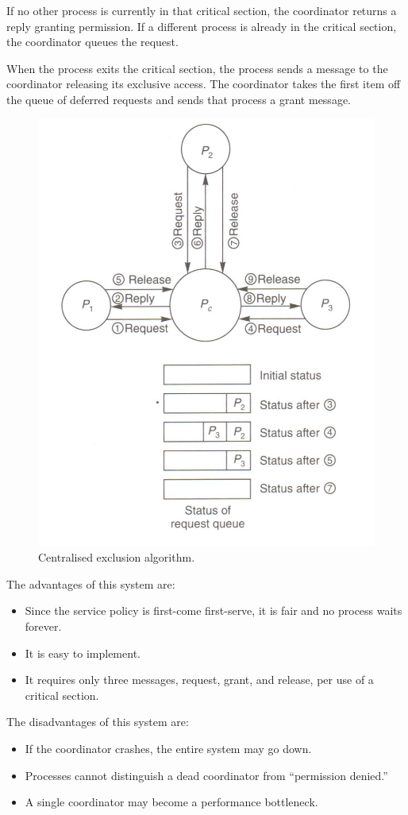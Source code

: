 If no other process is currently in that critical section, the coordinator returns a reply granting permission. If a different process is already in the critical section, the coordinator 
queues the request. 

When the process exits the critical section, the process sends a message to the coordinator releasing its exclusive access. The coordinator takes the first item off the queue of deferred requests and sends that process a grant message.

\begin{figure}
\centering
\includegraphics[width=0.7\linewidth]{figures/screenshot033}
\caption{Centralised exclusion algorithm.}
\label{fig:screenshot033}
\end{figure}

The advantages of this system are: \begin{itemize}
\item Since the service policy is first-come first-serve, it is fair and no process waits forever.
\item It is easy to implement.
\item It requires only three messages, request, grant, and release, per use of a critical section.
\end{itemize}

The disadvantages of this system are: \begin{itemize}
\item If the coordinator crashes, the entire system may go down.
\item Processes cannot distinguish a dead coordinator from “permission denied.”
\item A single coordinator may become a performance bottleneck. 
\end{itemize}

